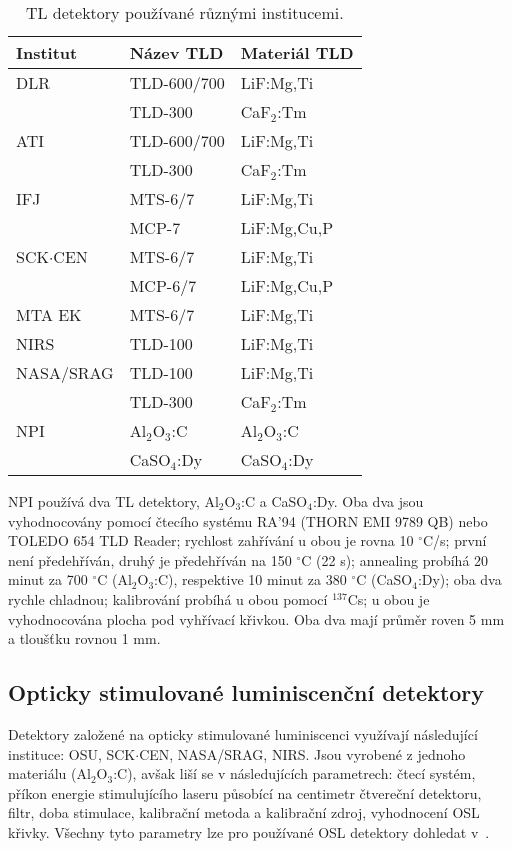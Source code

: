 \begin{table}[H]
  \centering
  \caption{TL detektory používané různými institucemi. \cite{dosis}}
  \label{tab:dosis_pouzivaneTLD}
  \begin{tabular}{lll}
	\toprule
Institut&Název TLD&Materiál TLD\\
\midrule
DLR			 &TLD-600/700  &LiF:Mg,Ti\\
			 &TLD-300	   &CaF$_2$:Tm\\
ATI			 &TLD-600/700  &LiF:Mg,Ti\\
			 &TLD-300	   &CaF$_2$:Tm\\
IFJ			 &MTS-6/7	   &LiF:Mg,Ti\\
			 &MCP-7		   &LiF:Mg,Cu,P\\
SCK$\cdot$CEN&MTS-6/7	   &LiF:Mg,Ti\\
			 &MCP-6/7	   &LiF:Mg,Cu,P\\
MTA EK		 &MTS-6/7	   &LiF:Mg,Ti\\
NIRS		 &TLD-100	   &LiF:Mg,Ti\\
NASA/SRAG	 &TLD-100	   &LiF:Mg,Ti\\
			 &TLD-300	   &CaF$_2$:Tm\\
NPI			 &Al$_2$O$_3$:C&Al$_2$O$_3$:C\\
			 &CaSO$_4$:Dy  &CaSO$_4$:Dy\\
	\bottomrule
  \end{tabular}
\end{table}

NPI používá dva TL detektory, Al$_2$O$_3$:C a CaSO$_4$:Dy. Oba dva jsou vyhodnocovány pomocí čtecího systému RA’94 (THORN EMI 9789 QB) nebo TOLEDO 654 TLD Reader; rychlost zahřívání u obou je rovna 10 $^{\circ}$C/s; první není předehříván, druhý je předehříván na 150 $^{\circ}$C (22 s); annealing probíhá 20 minut za 700 $^{\circ}$C (Al$_2$O$_3$:C), respektive 10 minut za 380 $^{\circ}$C (CaSO$_4$:Dy); oba dva rychle chladnou; kalibrování probíhá u obou pomocí $^{137}$Cs; u obou je vyhodnocována plocha pod vyhřívací křivkou. Oba dva mají průměr roven 5 mm a tloušťku rovnou 1 mm.
\subsection{Opticky stimulované luminiscenční detektory}
Detektory založené na opticky stimulované luminiscenci využívají následující instituce: OSU, SCK$\cdot$CEN, NASA/SRAG, NIRS. Jsou vyrobené z jednoho materiálu (Al$_2$O$_3$:C), avšak liší se v následujících parametrech: čtecí systém, příkon energie stimulujícího laseru působící na centimetr čtvereční detektoru, filtr, doba stimulace, kalibrační metoda a kalibrační zdroj, vyhodnocení OSL křivky. Všechny tyto parametry lze pro používané OSL detektory dohledat v~\cite{dosis}. 
